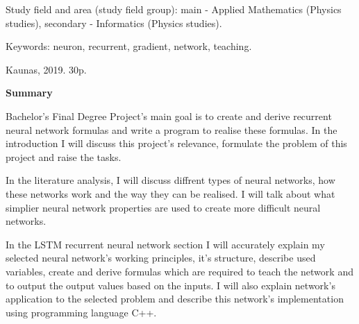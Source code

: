 Study field and area (study field group): main - Applied Mathematics (Physics studies), secondary - Informatics (Physics studies).

Keywords: neuron, recurrent, gradient, network, teaching.

Kaunas, 2019. 30p.

\begin{center}
\textbf{Summary}
\end{center}

Bachelor's Final Degree Project's main goal is to create and derive recurrent neural network formulas and write a program to realise these formulas. In the introduction I will discuss this project's relevance, formulate the problem of this project and raise the tasks.

In the literature analysis, I will discuss diffrent types of neural networks, how these networks work and the way they can be realised. I will talk about what simplier neural network properties are used to create more difficult neural networks.

In the LSTM recurrent neural network section I will accurately explain my selected neural network's working principles, it's structure, describe used variables, create and derive formulas which are required to teach the network and to output the output values based on the inputs. I will also explain network's application to the selected problem and describe this network's implementation using programming language C++.


